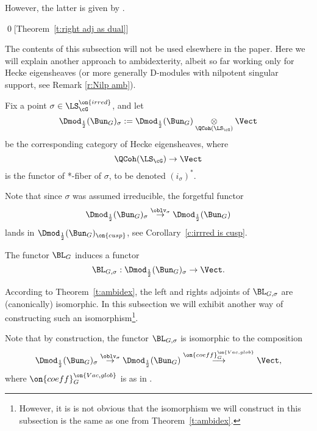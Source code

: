 \documentclass[9pt]{amsart}
\theoremstyle{remark}
\newtheorem{rem}[subsubsection]{Remark}
\theoremstyle{definition}
\theoremstyle{remark}
\newcommand{\thmref}[1]{Theorem~\ref{#1}}
\newcommand{\corref}[1]{Corollary~\ref{#1}}
\numberwithin{equation}{section}
\begin{document}
However, the latter is given by \cite[Proposition 15.1.10]{GLC3}.

\qed[\thmref{t:right adj as dual}]


The contents of this subsection will not be used elsewhere in the paper. Here we will explain another 
approach to ambidexterity, albeit so far working only for Hecke eigensheaves (or more generally
D-modules with nilpotent singular support, see Remark \ref{r:Nilp amb}). 

\sssec{}

Fix a point $\sigma\in \LS^{\on{irred}}_\cG$, and let
$$\Dmod_{\frac{1}{2}}(\Bun_G)_\sigma:=\Dmod_{\frac{1}{2}}(\Bun_G)\underset{\QCoh(\LS_\cG)}\otimes \Vect$$
be the corresponding category of Hecke eigensheaves, where
$$\QCoh(\LS_\cG)\to \Vect$$
is the functor of *-fiber of $\sigma$, to be denoted $(i_\sigma)^*$. 

\medskip

Note that since $\sigma$ was assumed irreducible, the forgetful functor
\begin{equation} \label{e:forget sigma}
\Dmod_{\frac{1}{2}}(\Bun_G)_\sigma\overset{\oblv_\sigma}\to \Dmod_{\frac{1}{2}}(\Bun_G)
\end{equation} 
lands in $ \Dmod_{\frac{1}{2}}(\Bun_G)_{\on{cusp}}$, see \corref{c:irrred is cusp}. 

\sssec{}

The functor $\BL_G$ induces a functor
$$\BL_{G,\sigma}:\Dmod_{\frac{1}{2}}(\Bun_G)_\sigma\to \Vect.$$

According to \thmref{t:ambidex}, the left and rights adjoints of $\BL_{G,\sigma}$ are (canonically) isomorphic. 
In this subsection we will exhibit another way of constructing such an isomorphism\footnote{However, it is is not
obvious that the isomorphism we will construct in this subsection is the same as one from \thmref{t:ambidex}.}.


\sssec{}

Note that by construction, the functor $\BL_{G,\sigma}$ is isomorphic to the composition
$$\Dmod_{\frac{1}{2}}(\Bun_G)_\sigma \overset{\oblv_\sigma}\to 
\Dmod_{\frac{1}{2}}(\Bun_G)\overset{\on{coeff}_G^{\on{Vac,glob}}}\longrightarrow \Vect,$$
where $\on{coeff}_G^{\on{Vac,glob}}$ is as in \cite[Sect. 9.6.3]{GLC2}.
\end{document}

